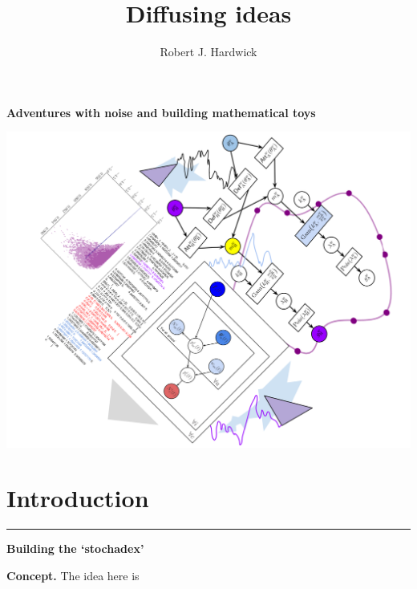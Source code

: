 \documentclass[sts]{imsart}
\begin{document}
\begin{titlepage}

\title{Diffusing ideas}
\vspace*{0.3cm}
\hspace*{-0.5cm}
{\Large \bfseries\sffamily \color{gray75} Adventures with noise and building mathematical toys}

\vspace*{3cm}
\centering
\includegraphics[width=15cm]{images/frontmatter_mashup.png}

\vspace*{4cm}
\author{Robert J. Hardwick}


\end{titlepage}

\newpage
\section*{Introduction}


\newpage
{\color{gray75} {\Huge \bfseries{}} \hspace*{0.2em} \rule[-0.5ex]{0.3ex}{2.0em}} \hspace*{0.2em} {\Huge \bfseries\sffamily Building the `stochadex'}

\vspace*{1cm}
{\bfseries\sffamily Concept.} The idea here is 

\vspace*{1cm}
\end{document}
